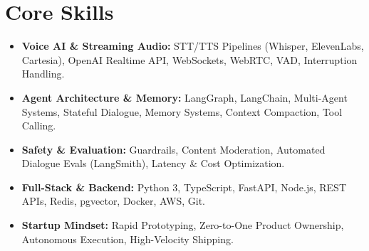 \documentclass[a4paper,10pt]{article}
\begin{document}
\section{Core Skills}
\begin{itemize}
  \item \textbf{Voice AI \& Streaming Audio:} STT/TTS Pipelines (Whisper, ElevenLabs, Cartesia), OpenAI Realtime API, WebSockets, WebRTC, VAD, Interruption Handling.
  \item \textbf{Agent Architecture \& Memory:} LangGraph, LangChain, Multi-Agent Systems, Stateful Dialogue, Memory Systems, Context Compaction, Tool Calling.
  \item \textbf{Safety \& Evaluation:} Guardrails, Content Moderation, Automated Dialogue Evals (LangSmith), Latency \& Cost Optimization.
  \item \textbf{Full-Stack \& Backend:} Python 3, TypeScript, FastAPI, Node.js, REST APIs, Redis, pgvector, Docker, AWS, Git.
  \item \textbf{Startup Mindset:} Rapid Prototyping, Zero-to-One Product Ownership, Autonomous Execution, High-Velocity Shipping.
\end{itemize}
\end{document}
